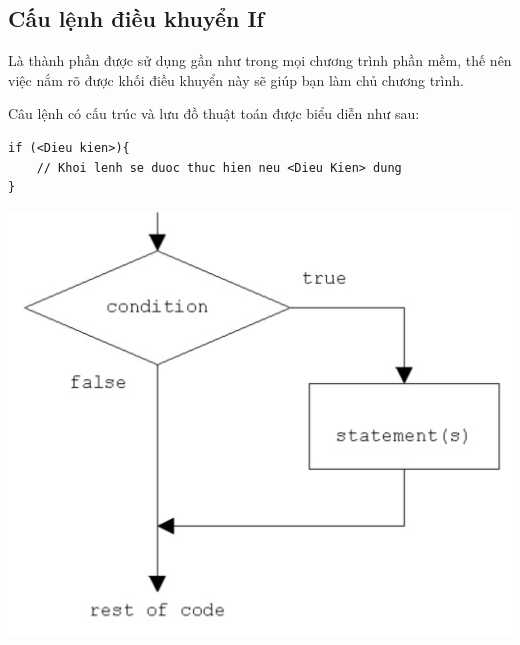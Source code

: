 \documentclass[12pt,a4paper]{article}
\begin{document}
\subsection{Cấu lệnh điều khuyển If }
Là thành phần được sử dụng gần như trong mọi chương trình phần mềm, thế nên việc nắm rõ được khối điều khuyển này sẽ giúp bạn làm chủ chương trình.

	Câu lệnh có cấu trúc và lưu đồ thuật toán được biểu diễn như sau:
\begin{lstlisting}
if (<Dieu kien>){
    // Khoi lenh se duoc thuc hien neu <Dieu Kien> dung
}\end{lstlisting}
\begin{center}
	\includegraphics[scale = 0.7]{Ifelsestatement}
\end{center}
\end{document}
